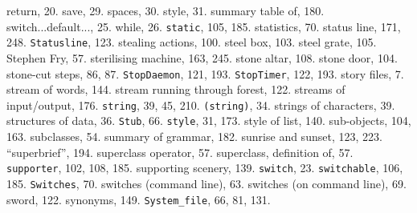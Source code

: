 \quad  return, 20.
\quad  save, 29.
\quad  spaces, 30.
\quad  style, 31.
\quad  summary table of, 180.
\quad  switch...default..., 25.
\quad  while, 26.
{{\tt static}}, 105, 185.
statistics, 70.
status line, 171, 248.
{{\tt Statusline}}, 123.
stealing actions, 100.
steel box, 103.
steel grate, 105.
Stephen Fry, 57.
sterilising machine, 163, 245.
stone altar, 108.
stone door, 104.
stone-cut steps, 86, 87.
{{\tt StopDaemon}}, 121, 193.
{{\tt StopTimer}}, 122, 193.
story files, 7.
stream of words, 144.
stream running through forest, 122.
streams of input/output, 176.
{{\tt string}}, 39, 45, 210.
{{\tt (string)}}, 34.
strings of characters, 39.
structures of data, 36.
{{\tt Stub}}, 66.
{{\tt style}}, 31, 173.
style of list, 140.
sub-objects, 104, 163.
subclasses, 54.
summary of grammar, 182.
sunrise and sunset, 123, 223.
``superbrief'', 194.
superclass operator, 57.
superclass, definition of, 57.
{{\tt supporter}}, 102, 108, 185.
supporting scenery, 139.
{{\tt switch}}, 23.
{{\tt switchable}}, 106, 185.
{{\tt Switches}}, 70.
switches (command line), 63.
switches (on command line), 69.
sword, 122.
synonyms, 149.
{{\tt System\_file}}, 66, 81, 131.

